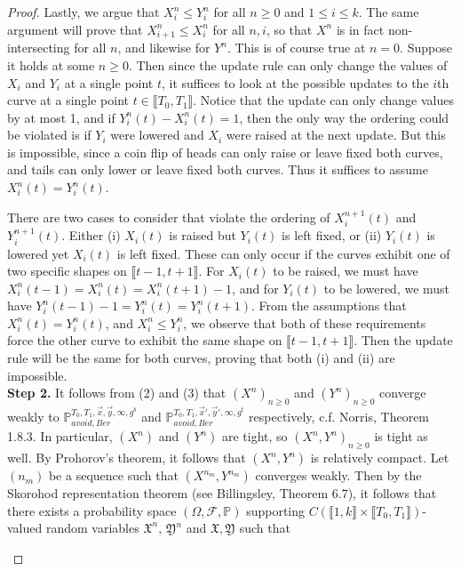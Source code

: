 \begin{proof}
	Lastly, we argue that $X^n_i\leq Y^n_i$ for all $n\geq 0$ and $1\leq i\leq k$. The same argument will prove that $X^n_{i+1}\leq X^n_i$ for all $n,i$, so that $X^n$ is in fact non-intersecting for all $n$, and likewise for $Y^n$. This is of course true at $n=0$. Suppose it holds at some $n\geq 0$. Then since the update rule can only change the values of $X_i$ and $Y_i$ at a single point $t$, it suffices to look at the possible updates to the $i$th curve at a single point $t\in\llbracket T_0, T_1\rrbracket$. Notice that the update can only change values by at most 1, and if $Y^n_i(t) - X^n_i(t) = 1$, then the only way the ordering could be violated is if $Y_i$ were lowered and $X_i$ were raised at the next update. But this is impossible, since a coin flip of heads can only raise or leave fixed both curves, and tails can only lower or leave fixed both curves. Thus it suffices to assume $X^n_i(t) = Y^n_i(t)$. 
	
	There are two cases to consider that violate the ordering of $X^{n+1}_i(t)$ and $Y^{n+1}_i(t)$. Either (i) $X_i(t)$ is raised but $Y_i(t)$ is left fixed, or (ii) $Y_i(t)$ is lowered yet $X_i(t)$ is left fixed. These can only occur if the curves exhibit one of two specific shapes on $\llbracket t-1, t+1\rrbracket$. For $X_i(t)$ to be raised, we must have $X^n_i(t-1) = X^n_i(t) = X^n_i(t+1) - 1$, and for $Y_i(t)$ to be lowered, we must have $Y^n_i(t-1) - 1 = Y^n_i(t) = Y^n_i(t+1)$. From the assumptions that $X^n_i(t) = Y^n_i(t)$, and $X^n_i \leq Y^n_i$, we observe that both of these requirements force the other curve to exhibit the same shape on $\llbracket t-1, t+1\rrbracket$. Then the update rule will be the same for both curves, proving that both (i) and (ii) are impossible. \\
	
	\noindent\textbf{Step 2.} It follows from (2) and (3) that $(X^n)_{n\geq 0}$ and $(Y^n)_{n\geq 0}$ converge weakly to $\mathbb{P}_{avoid,Ber}^{T_0,T_1,\vec{x},\vec{y},\infty,g^b}$ and $\mathbb{P}_{avoid,Ber}^{T_0,T_1,\vec{x}',\vec{y}',\infty,g^t}$ respectively, c.f. Norris, Theorem 1.8.3. In particular, $(X^n)$ and $(Y^n)$ are tight, so $(X^n,Y^n)_{n\geq 0}$ is tight as well. By Prohorov's theorem, it follows that $(X^n,Y^n)$ is relatively compact. Let $(n_m)$ be a sequence such that $(X^{n_m},Y^{n_m})$ converges weakly. Then by the Skorohod representation theorem (see Billingsley, Theorem 6.7), it follows that there exists a probability space $(\Omega,\mathcal{F},\mathbb{P})$ supporting $C(\llbracket 1, k\rrbracket \times \llbracket T_0, T_1\rrbracket)$-valued random variables $\mathfrak{X}^n$, $\mathfrak{Y}^n$ and $\mathfrak{X},\mathfrak{Y}$ such that
	\begin{enumerate}[label=(\arabic*)]
		

\end{enumerate}
\end{proof}
